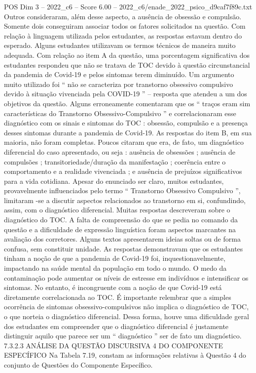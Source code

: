 \begin{textsample}{POS Dim 3 – 2022\_c6 – Score 6.00 – 2022\_c6/enade\_2022\_psico\_d9caf7f89c.txt}
Outros consideraram, além desse aspecto, a ausência de obsessão e compulsão.
Somente dois conseguiram associar todos os fatores solicitados na questão.
Com relação à linguagem utilizada pelos estudantes, as respostas estavam dentro do esperado.
Alguns estudantes utilizavam os termos técnicos de maneira muito adequada.
Com relação ao item A da questão, uma porcentagem significativa dos estudantes respondeu que não se tratava de TOC devido à questão circunstancial da pandemia de Covid-19 e pelos sintomas terem diminuído.
Um argumento muito utilizado foi “ não se caracteriza por transtorno obsessivo compulsivo devido à situação vivenciada pela COVID-19 ” – resposta que atendeu a um dos objetivos da questão.
Alguns erroneamente comentaram que os “ traços eram sim características do Transtorno Obsessivo-Compulsivo ” e correlacionaram esse diagnóstico com os sinais e sintomas do TOC : obsessão, compulsão e a presença desses sintomas durante a pandemia de Covid-19.
As respostas do item B, em sua maioria, não foram completas.
Poucos citaram que era, de fato, um diagnóstico diferencial do caso apresentado, ou seja : ausência de obsessões ; ausência de compulsões ; transitoriedade/duração da manifestação ; coerência entre o comportamento e a realidade vivenciada ; e ausência de prejuízos significativos para a vida cotidiana.
Apesar do enunciado ser claro, muitos estudantes, provavelmente influenciados pelo termo “ Transtorno Obsessivo Compulsivo ”, limitaram -se a discutir aspectos relacionados ao transtorno em si, confundindo, assim, com o diagnóstico diferencial.
Muitas respostas descreveram sobre o diagnóstico do TOC.
A falta de compreensão do que se pedia no comando da questão e a dificuldade de expressão linguística foram aspectos marcantes na avaliação dos corretores.
Alguns textos apresentarem ideias soltas ou de forma confusa, sem constituir unidade.
As respostas demonstravam que os estudantes tinham a noção de que a pandemia de Covid-19 foi, inquestionavelmente, impactando na saúde mental da população em todo o mundo.
O medo da contaminação pode aumentar os níveis de estresse em indivíduos e intensificar os sintomas.
No entanto, é incongruente com a noção de que Covid-19 está diretamente correlacionada ao TOC.
É importante relembrar que a simples ocorrência de sintomas obsessivo-compulsivos não implica o diagnóstico de TOC, o que norteia o diagnóstico diferencial.
Dessa forma, houve uma dificuldade geral dos estudantes em compreender que o diagnóstico diferencial é justamente distinguir aquilo que parece ser um “ diagnóstico ” ser de fato um diagnóstico. 7.3.2.3 ANÁLISE DA QUESTÃO DISCURSIVA 4 DO COMPONENTE ESPECÍFICO Na Tabela 7.19, constam as informações relativas à Questão 4 do conjunto de Questões do Componente Específico.

\end{textsample}
